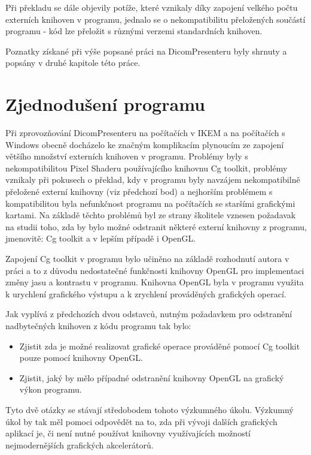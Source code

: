 Při překladu se dále objevily potíže, které vznikaly díky zapojení velkého počtu externích knihoven v programu, jednalo se o nekompatibilitu přeložených součástí programu - kód lze přeložit s různými verzemi standardních knihoven.

Poznatky získané při výše popsané práci na DicomPresenteru byly shrnuty a popsány v druhé kapitole této práce.

\section{Zjednodušení programu}
Při zprovozňování DicomPresenteru na počítačích v IKEM a na počítačích s Windows obecně docházelo ke značným komplikacím plynoucím ze zapojení většího množství externích knihoven v programu. Problémy byly s nekompatibilitou Pixel Shaderu používajícího knihovnu Cg toolkit, problémy vznikaly při pokusech o překlad, kdy v programu byly navzájem nekompatibilně přeložené externí knihovny (viz předchozí bod) a nejhorším problémem s kompatibilitou byla nefunkčnost programu na počítačích se staršími grafickými kartami. Na základě těchto problémů byl ze strany školitele vznesen požadavak na studii toho, zda by bylo možné odstranit některé externí knihovny z programu, jmenovitě: Cg toolkit a v lepším případě i OpenGL.

Zapojení Cg toolkit v programu bylo učiněno na základě rozhodnutí autora v práci \cite{neskudla} a to z důvodu nedostatečné funkčnosti knihovny OpenGL pro implementaci změny jasu a kontrastu v programu. Knihovna OpenGL byla v programu využita k urychlení grafického výstupu a k zrychlení prováděných grafických operací.

Jak vyplívá z předchozích dvou odstavců, nutným požadavkem pro odstranění nadbytečných knihoven z kódu programu tak bylo:

\begin{itemize}
\item Zjistit zda je možné realizovat grafické operace prováděné pomocí Cg toolkit pouze pomocí knihovny OpenGL.
\item Zjistit, jaký by mělo případné odstranění knihovny OpenGL na grafický výkon programu.
\end{itemize}

Tyto dvě otázky se stávají středobodem tohoto výzkumného úkolu. Výzkumný úkol by tak měl pomoci odpovědět na to, zda při vývoji dalších grafických aplikací je, či není nutné používat knihovny využívajících možností nejmodernějších grafických akcelerátorů.

